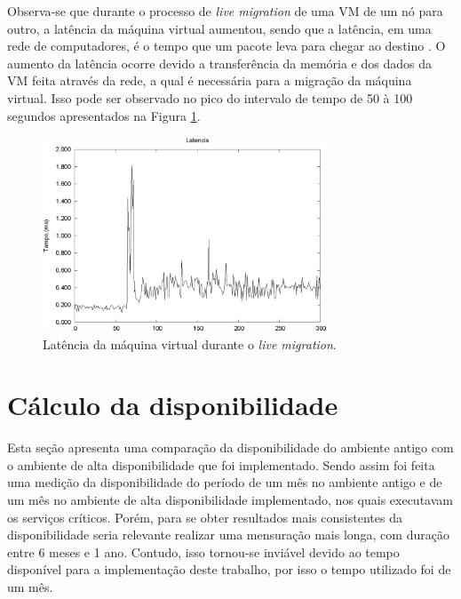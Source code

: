 Observa-se que durante o processo de \textit{live migration} de uma \ac{VM} de um nó para outro, a latência da máquina virtual aumentou, 
sendo que a latência, em uma rede de computadores, é o tempo que um pacote leva para chegar ao destino \cite{geordano2014}.
O aumento da latência ocorre devido a transferência da memória e dos dados da \ac{VM} feita através da rede, a qual é necessária para a migração 
da máquina virtual. Isso pode ser observado no pico do intervalo de tempo de 50 à 100 segundos apresentados na Figura \ref{fig:teste2_latencia}.

\begin{figure}[h!]
 \centering
 \includegraphics[width=320px]{img/teste2_latencia.eps}
 \caption{Latência da máquina virtual durante o \textit{live migration}.}
 \label{fig:teste2_latencia}
\end{figure}


\section{Cálculo da disponibilidade}
\label{section:comparacaofinal}

Esta seção apresenta uma comparação da disponibilidade do ambiente antigo com o ambiente de alta disponibilidade que foi implementado. 
Sendo assim foi feita uma medição da disponibilidade do período de um mês no ambiente antigo e de um mês no ambiente de alta disponibilidade 
implementado, nos quais executavam os serviços críticos. Porém, para se obter resultados mais consistentes da disponibilidade seria relevante 
realizar uma mensuração mais longa, com duração entre 6 meses e 1 ano. Contudo, isso tornou-se inviável devido ao tempo disponível para a 
implementação deste trabalho, por isso o tempo utilizado foi de um mês. 

